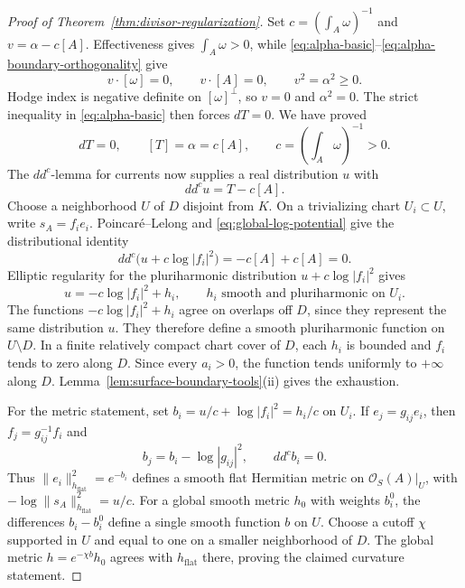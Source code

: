 \documentclass[11pt]{amsart}
\theoremstyle{definition}
\theoremstyle{remark}
\numberwithin{equation}{section}
\newcommand{\OO}{\mathcal O}
\newcommand{\ddc}{dd^c}
\begin{document}
\begin{proof}[Proof of Theorem~\ref{thm:divisor-regularization}]
Set $c=(\int_A\omega)^{-1}$ and $v=\alpha-c[A]$.
Effectiveness gives $\int_A\omega>0$, while
\eqref{eq:alpha-basic}--\eqref{eq:alpha-boundary-orthogonality} give
\[
 v\cdot[\omega]=0,\qquad v\cdot[A]=0,\qquad v^2=\alpha^2\ge0.
\]
Hodge index is negative definite on $[\omega]^\perp$, so $v=0$
and $\alpha^2=0$. The strict inequality in
\eqref{eq:alpha-basic} then forces $dT=0$. We have proved
\begin{equation}\label{eq:closed-current-null-class}
 dT=0,\qquad [T]=\alpha=c[A],\qquad
 c=\left(\int_A\omega\right)^{-1}>0.
\end{equation}
The $\ddc$-lemma for currents now supplies a real distribution $u$ with
\begin{equation}\label{eq:global-log-potential}
 \ddc u=T-c[A].
\end{equation}
Choose a neighborhood $U$ of $D$ disjoint from $K$.
On a trivializing chart $U_i\subset U$, write
$s_A=f_i e_i$. Poincar\'e--Lelong and
\eqref{eq:global-log-potential} give the distributional identity
\[
 \ddc\bigl(u+c\log|f_i|^2\bigr)
 =-c[A]+c[A]=0.
\]
Elliptic regularity for the pluriharmonic distribution
$u+c\log|f_i|^2$ gives
\begin{equation}\label{eq:local-log-collar}
 u=-c\log|f_i|^2+h_i,
 \qquad h_i\text{ smooth and pluriharmonic on }U_i.
\end{equation}
The functions $-c\log|f_i|^2+h_i$
agree on overlaps off $D$, since they represent the same distribution $u$.
They therefore define a smooth pluriharmonic function on
$U\setminus D$. In a finite relatively compact chart cover of $D$,
each $h_i$ is bounded and $f_i$ tends to zero along $D$. Since
every $a_i>0$, the function tends uniformly to $+\infty$ along $D$.
Lemma~\ref{lem:surface-boundary-tools}\textup{(ii)} gives the exhaustion.

For the metric statement, set
$b_i=u/c+\log|f_i|^2=h_i/c$ on $U_i$.
If $e_j=g_{ij}e_i$, then $f_j=g_{ij}^{-1}f_i$ and
\[
 b_j=b_i-\log|g_{ij}|^2,\qquad \ddc b_i=0.
\]
Thus $\|e_i\|_{h_{\mathrm{flat}}}^2=e^{-b_i}$ defines a smooth flat
Hermitian metric on $\OO_S(A)|_U$, with
$-\log\|s_A\|_{h_{\mathrm{flat}}}^2=u/c$.
For a global smooth metric $h_0$ with weights $b_i^0$, the
differences $b_i-b_i^0$ define a single smooth function $b$ on $U$.
Choose a cutoff $\chi$ supported in $U$ and equal to one on a
smaller neighborhood of $D$. The global metric
$h=e^{-\chi b}h_0$ agrees with $h_{\mathrm{flat}}$ there, proving the
claimed curvature statement.
\end{proof}
\end{document}
